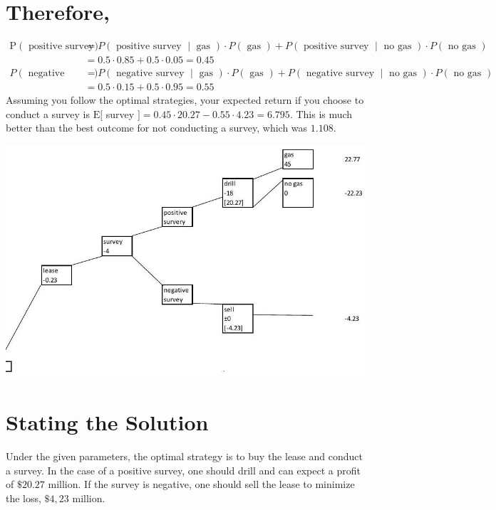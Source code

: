 \documentclass[10pt]{article}
\begin{document}
\section{Therefore,}
$$
\begin{aligned}
\mathrm{P}(\text { positive survey }) &=P(\text { positive survey } \mid \text { gas }) \cdot P(\text { gas })+P(\text { positive survey } \mid \text { no gas }) \cdot P(\text { no gas }) \\
&=0.5 \cdot 0.85+0.5 \cdot 0.05=0.45 \\
P(\text { negative survey }) &=P(\text { negative survey } \mid \text { gas }) \cdot P(\text { gas })+P(\text { negative survey } \mid \text { no gas }) \cdot P(\text { no gas }) \\
&=0.5 \cdot 0.15+0.5 \cdot 0.95=0.55
\end{aligned}
$$
Assuming you follow the optimal strategies, your expected return if you choose to conduct a survey is $\mathrm{E}[$ survey $]=0.45 \cdot 20.27-0.55 \cdot 4.23=6.795$. This is much better than the best outcome for not conducting a survey, which was $1.108 .$

\includegraphics[max width=\textwidth]{2022_07_05_5945264bba2a5f6ba667g-65}

\section{Stating the Solution}
Under the given parameters, the optimal strategy is to buy the lease and conduct a survey. In the case of a positive survey, one should drill and can expect a profit of $\$ 20.27$ million. If the survey is negative, one should sell the lease to minimize the loss, $\$ 4,23$ million.
\end{document}
